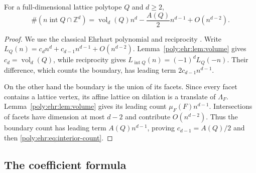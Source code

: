 \documentclass[11pt,a4paper]{article}
\numberwithin{equation}{section}
\theoremstyle{plain}
\newcommand{\Z}{\mathbb Z}
\newcommand{\intr}{\operatorname{int}}
\newcommand{\vol}{\operatorname{vol}}
\begin{document}
\begin{lemma}\label{poly:ehr:lem:interior-count}
For a full-dimensional lattice polytope $Q$ and $d\geq2$,
\begin{equation}\label{poly:ehr:eq:interior-count}
 \#(n\intr Q\cap\Z^d)
   =\vol_d(Q)n^d-\frac{A(Q)}2n^{d-1}+O(n^{d-2}).
\end{equation}
\end{lemma}
\begin{proof}
We use the classical Ehrhart polynomial and reciprocity
\cite{ehr:sam-woods}. Write $L_Q(n)=c_dn^d+c_{d-1}n^{d-1}+O(n^{d-2})$.
Lemma~\ref{poly:ehr:lem:volume} gives $c_d=\vol_d(Q)$, while reciprocity gives
$L_{\intr Q}(n)=(-1)^dL_Q(-n)$. Their difference, which counts the
boundary, has leading term $2c_{d-1}n^{d-1}$.

On the other hand the boundary is the union of its facets. Since every
facet contains a lattice vertex, its affine lattice on dilation is a
translate of $\Lambda_F$. Lemma~\ref{poly:ehr:lem:volume} gives its leading count
$\mu_F(F)n^{d-1}$. Intersections of facets have dimension at most $d-2$
and contribute $O(n^{d-2})$. Thus the boundary count has leading term
$A(Q)n^{d-1}$, proving $c_{d-1}=A(Q)/2$ and then
\eqref{poly:ehr:eq:interior-count}.
\end{proof}

\subsection{The coefficient formula}
\end{document}
